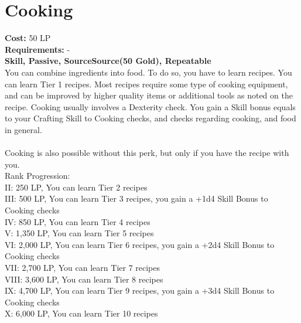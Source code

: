 \section{Cooking}\label{perk:cooking}
\textbf{Cost:} 50 LP\\
\textbf{Requirements:} -\\
\textbf{Skill, Passive, SourceSource(50 Gold), Repeatable}\\
You can combine ingredients into food.
To do so, you have to learn recipes.
You can learn Tier 1 recipes.
Most recipes require some type of cooking equipment, and can be improved by higher quality items or additional tools as noted on the recipe.
Cooking usually involves a Dexterity check.
You gain a Skill bonus equals to your Crafting Skill to Cooking checks, and checks regarding cooking, and food in general. \\
\\
Cooking is also possible without this perk, but only if you have the recipe with you.
\\
Rank Progression:\\
II: 250 LP, You can learn Tier 2 recipes\\
III: 500 LP, You can learn Tier 3 recipes, you gain a +1d4 Skill Bonus to Cooking checks\\
IV: 850 LP, You can learn Tier 4 recipes\\
V: 1,350 LP, You can learn Tier 5 recipes\\
VI: 2,000 LP, You can learn Tier 6 recipes, you gain a +2d4 Skill Bonus to Cooking checks\\
VII: 2,700 LP, You can learn Tier 7 recipes\\
VIII: 3,600 LP, You can learn Tier 8 recipes\\
IX: 4,700 LP, You can learn Tier 9 recipes, you gain a +3d4 Skill Bonus to Cooking checks\\
X: 6,000 LP, You can learn Tier 10 recipes\\